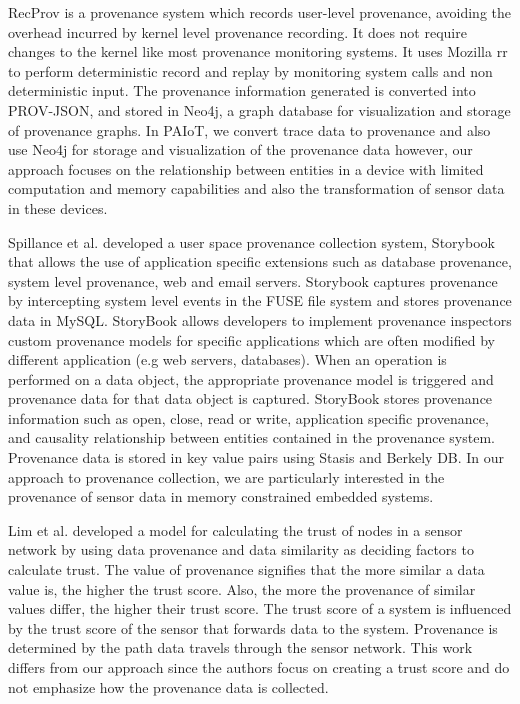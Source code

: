 \documentclass[conference]{IEEEtran}
\begin{document}
\par RecProv \cite{rec_prov} is a provenance system which records user-level provenance, avoiding the overhead incurred by kernel level provenance recording. It does not require changes to the kernel like most provenance monitoring systems. It uses Mozilla rr to perform deterministic record and replay by monitoring system calls  and non deterministic input. The provenance information generated is converted into PROV-JSON, and stored in Neo4j, a graph database for visualization and storage of provenance graphs. In PAIoT, we convert trace data to provenance and also use Neo4j for storage and visualization of the provenance data however, our approach focuses on the relationship between entities in a device with limited computation and memory capabilities and also the transformation of sensor data in these devices.



\par Spillance et al. \cite{story} developed a user space provenance collection system, Storybook that allows the use of application specific extensions such as database provenance, system level provenance, web and email servers. Storybook captures provenance by intercepting system level events in the FUSE file system and stores provenance data in MySQL. StoryBook allows developers to implement provenance inspectors custom provenance models for specific applications which are often modified by different application (e.g web servers, databases). When an operation is performed on a data object, the appropriate provenance model is triggered and provenance data for that data object is captured. StoryBook stores provenance information such as open, close, read or write, application specific provenance, and causality relationship between entities contained in the provenance system. Provenance data is stored in key value pairs using Stasis and Berkely DB.  In our approach to provenance collection, we are particularly interested in the provenance of sensor data in memory constrained embedded systems.



\par Lim et al. \cite{lim} developed a
model for calculating the trust of nodes in a sensor network by using data
provenance and data similarity as deciding factors to calculate trust. The value of
provenance signifies that the more similar a data value is, the higher the trust score.
Also, the more the provenance of similar values differ, the higher their trust score. The trust score of a system is influenced by the trust score of the sensor that forwards data to the system. Provenance is determined by the path data travels through the sensor network. This work differs from our approach since the authors focus on creating a trust score and do not emphasize
how the provenance data is collected. 
\end{document}
